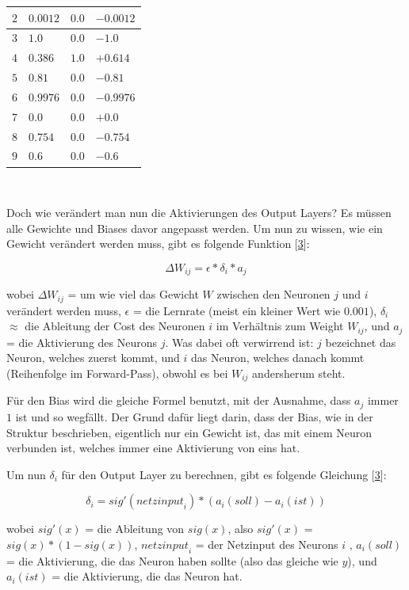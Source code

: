 \documentclass[11pt, a4paper, ngerman]{article}
\begin{document}
\begin{minipage}{\linewidth}
\begin{minipage}{0.6\linewidth}
\begin{tabularx}{\linewidth}{X|l|l|l}
					\hline
					$2$ & $0.0012$ & $0.0$ & $-0.0012$\\
					\hline
					$3$ & $1.0$ & $0.0$ & $-1.0$\\
					\hline
					$4$ & $0.386$ & $1.0$ & $+0.614$\\
					\hline
					$5$ & $0.81$ & $0.0$ & $-0.81$\\
					\hline
					$6$ & $0.9976$ & $0.0$ & $-0.9976$\\
					\hline
					$7$	& $0.0$	& $0.0$	& $+0.0$\\
					\hline
					$8$	& $0.754$ & $0.0$ & $-0.754$\\
					\hline
					$9$	& $0.6$ & $0.0$	& $-0.6$\\
				\end{tabularx}
			\end{minipage}
		\end{minipage}\\[2ex]\par
		Doch wie verändert man nun die Aktivierungen des Output Layers? Es müssen alle Gewichte und Biases davor angepasst werden. Um nun zu wissen, wie ein Gewicht verändert werden muss, gibt es folgende Funktion [\hyperref[src:3]{3}]:
		
		{\Large \[\Delta W_{ij} = \epsilon * \delta_i * a_j\]}
		
		\noindent wobei ${\Delta W}_{ij}$ = um wie viel das Gewicht $W$ zwischen den Neuronen $j$ und $i$ verändert werden muss, $\epsilon$ = die Lernrate (meist ein kleiner Wert wie $0.001$), $\delta_i$  $\approx$ die Ableitung der Cost des Neuronen $i$ im Verhältnis zum Weight $W_{ij}$, und $a_j$ = die Aktivierung des Neurons $j$. Was dabei oft verwirrend ist: $j$ bezeichnet das Neuron, welches zuerst kommt, und $i$ das Neuron, welches danach kommt (Reihenfolge im Forward-Pass), obwohl es bei $W_{ij}$ andersherum steht.
		
		Für den Bias wird die gleiche Formel benutzt, mit der Ausnahme, dass $a_j$ immer $1$ ist und so wegfällt. Der Grund dafür liegt darin, dass der Bias, wie in der Struktur beschrieben, eigentlich nur ein Gewicht ist, das mit einem Neuron verbunden ist, welches immer eine Aktivierung von eins hat.
		
		Um nun $\delta_i$ für den Output Layer zu berechnen, gibt es folgende Gleichung [\hyperref[src:3]{3}]:
		
		{\Large \[\delta_{i} = sig'({netzinput}_{i}) * (a_{i}(soll) - a_{i}(ist))\]}
		
		\noindent wobei $sig'(x)$ = die Ableitung von $sig(x)$, also $sig'(x)$ = $sig(x) * (1-sig(x))$, ${netzinput}_i$ = der Netzinput des Neurons $i$ , $a_{i}(soll)$ = die Aktivierung, die das Neuron haben sollte (also das gleiche wie $y$), und $a_{i}(ist)$ = die Aktivierung, die das Neuron hat.
		
\end{document}
